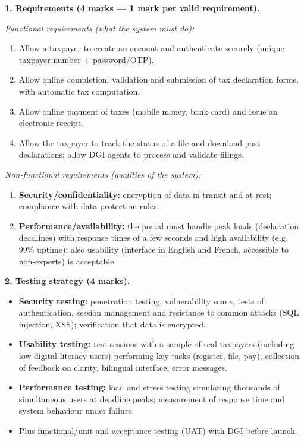 \documentclass[11pt]{article}
\begin{document}
\begin{corrige}
\textbf{1. Requirements (4 marks — 1 mark per valid requirement).}

\emph{Functional requirements (what the system must do):}
\begin{enumerate}
\item Allow a taxpayer to create an account and authenticate securely (unique taxpayer number + password/OTP).
\item Allow online completion, validation and submission of tax declaration forms, with automatic tax computation.
\item Allow online payment of taxes (mobile money, bank card) and issue an electronic receipt.
\item Allow the taxpayer to track the status of a file and download past declarations; allow DGI agents to process and validate filings.
\end{enumerate}

\emph{Non‑functional requirements (qualities of the system):}
\begin{enumerate}
\item \textbf{Security/confidentiality:} encryption of data in transit and at rest; compliance with data protection rules.
\item \textbf{Performance/availability:} the portal must handle peak loads (declaration deadlines) with response times of a few seconds and high availability (e.g. 99\% uptime); also usability (interface in English and French, accessible to non‑experts) is acceptable.
\end{enumerate}

\textbf{2. Testing strategy (4 marks).}
\begin{itemize}
\item \textbf{Security testing:} penetration testing, vulnerability scans, tests of authentication, session management and resistance to common attacks (SQL injection, XSS); verification that data is encrypted.
\item \textbf{Usability testing:} test sessions with a sample of real taxpayers (including low digital literacy users) performing key tasks (register, file, pay); collection of feedback on clarity, bilingual interface, error messages.
\item \textbf{Performance testing:} load and stress testing simulating thousands of simultaneous users at deadline peaks; measurement of response time and system behaviour under failure.
\item Plus functional/unit and acceptance testing (UAT) with DGI before launch.
\end{itemize}


\end{corrige}
\end{document}
